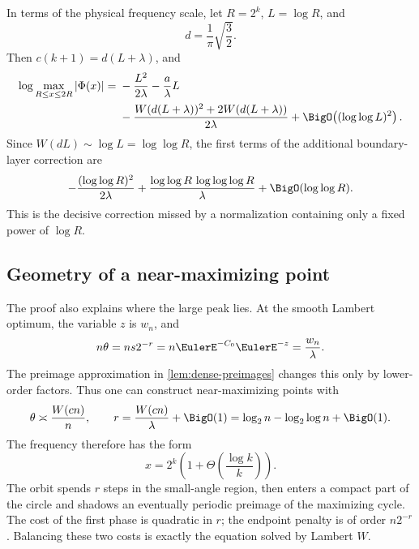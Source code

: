 \documentclass[11pt,oneside]{article}
\theoremstyle{definition}
\theoremstyle{remark}
\newcommand{\PhiF}{\Phi}
\begin{document}
In terms of the physical frequency scale, let \(R=2^k\),
\(L=\log R\), and
\begin{equation}
 d=\frac1\pi\sqrt{\frac32}.
 \label{eq:d-constant}
\end{equation}
Then \(c(k+1)=d(L+\lambda)\), and
\begin{equation}
\begin{split}
 \log\max_{R\le x\le2R}|\PhiF(x)|
 ={}&-\frac{L^2}{2\lambda}-\frac{a}{\lambda}L\\
 &-\frac{W(d(L+\lambda))^2+2W(d(L+\lambda))}{2\lambda}
 +\BigO\!\left((\log\log L)^2\right).
\end{split}
\label{eq:annulus-R-Lambert}
\end{equation}
Since \(W(dL)\sim\log L=\log\log R\), the first terms of the additional
boundary-layer correction are
\begin{equation}
 -\frac{(\log\log R)^2}{2\lambda}
 +\frac{\log\log R\,\log\log\log R}{\lambda}
 +\BigO(\log\log R).
 \label{eq:second-lognormal}
\end{equation}
This is the decisive correction missed by a normalization containing only a
fixed power of \(\log R\).

\subsection{Geometry of a near-maximizing point}

The proof also explains where the large peak lies.  At the smooth Lambert
optimum, the variable \(z\) is \(w_n\), and
\[
 n\theta=n s2^{-r}
 =n\EulerE^{-C_0}\EulerE^{-z}
 =\frac{w_n}{\lambda}.
\]
The preimage approximation in \cref{lem:dense-preimages} changes this only by
lower-order factors.  Thus one can construct near-maximizing points with
\begin{equation}
 \theta\asymp\frac{W(cn)}{n},
 \qquad
 r=\frac{W(cn)}{\lambda}+\BigO(1)
 =\log_2 n-\log_2\log n+\BigO(1).
 \label{eq:near-max-location}
\end{equation}
The frequency therefore has the form
\begin{equation}
 x=2^k\left(1+\Theta\!\left(\frac{\log k}{k}\right)\right).
 \label{eq:near-max-x}
\end{equation}
The orbit spends \(r\) steps in the small-angle region, then enters a compact
part of the circle and shadows an eventually periodic preimage of the
maximizing cycle.  The cost of the first phase is quadratic in \(r\); the
endpoint penalty is of order \(n2^{-r}\).  Balancing these two costs is exactly
the equation solved by Lambert \(W\).
\end{document}

